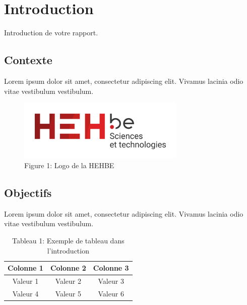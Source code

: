 \section{Introduction}
Introduction de votre rapport.

\subsection{Contexte}
Lorem ipsum dolor sit amet, consectetur adipiscing elit. Vivamus lacinia odio vitae vestibulum vestibulum.

\begin{figure}[!ht]
    \centering
    \includegraphics[width=8cm]{img/logo_hehbe_tech.png}
    \caption{Figure 1: Logo de la HEHBE}
    \label{fig:example_figure}
\end{figure}

\subsection{Objectifs}
Lorem ipsum dolor sit amet, consectetur adipiscing elit. Vivamus lacinia odio vitae vestibulum vestibulum.

\begin{table}[!ht]
    \centering
    \begin{tabular}{|c|c|c|}
        \hline
        Colonne 1 & Colonne 2 & Colonne 3 \\
        \hline
        Valeur 1 & Valeur 2 & Valeur 3 \\
        \hline
        Valeur 4 & Valeur 5 & Valeur 6 \\
        \hline
    \end{tabular}
    \caption{Tableau 1: Exemple de tableau dans l'introduction}
    \label{tab:example_table}
\end{table}

